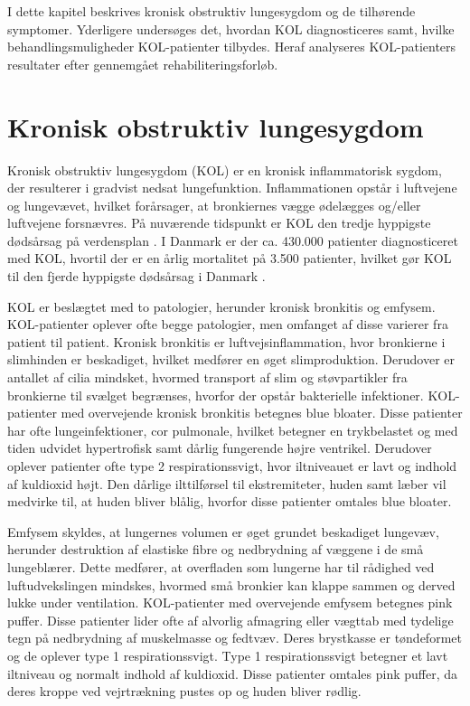 I dette kapitel beskrives kronisk obstruktiv lungesygdom og de tilhørende symptomer. Yderligere undersøges det, hvordan KOL diagnosticeres samt, hvilke behandlingsmuligheder KOL-patienter tilbydes. Heraf analyseres KOL-patienters resultater efter gennemgået rehabiliteringsforløb.

\section{Kronisk obstruktiv lungesygdom}
Kronisk obstruktiv lungesygdom (KOL) er en kronisk inflammatorisk sygdom, der resulterer i gradvist nedsat lungefunktion. Inflammationen opstår i luftvejene og lungevævet, hvilket forårsager, at bronkiernes vægge ødelægges og/eller luftvejene forsnævres. På nuværende tidspunkt er KOL den tredje hyppigste dødsårsag på verdensplan \cite{WHO2017}. I Danmark er der ca. 430.000 patienter diagnosticeret med KOL, hvortil der er en årlig mortalitet på 3.500 patienter, hvilket gør KOL til den fjerde hyppigste dødsårsag i Danmark \cite{Basisbogen2016}.


KOL er beslægtet med to patologier, herunder kronisk bronkitis og emfysem. KOL-patienter oplever ofte begge patologier, men omfanget af disse varierer fra patient til patient.\cite{Basisbogen2016}
Kronisk bronkitis er luftvejsinflammation, hvor bronkierne i slimhinden er beskadiget, hvilket medfører en øget slimproduktion. Derudover er antallet af cilia mindsket, hvormed transport af slim og støvpartikler fra bronkierne til svælget begrænses, hvorfor der opstår bakterielle infektioner.\cite{Frausing2011,Britannica2016} KOL-patienter med overvejende kronisk bronkitis betegnes blue bloater. Disse patienter har ofte lungeinfektioner, cor pulmonale, hvilket betegner en trykbelastet og med tiden udvidet hypertrofisk samt dårlig fungerende højre ventrikel. Derudover oplever patienter ofte  type 2 respirationssvigt, hvor iltniveauet er lavt og indhold af kuldioxid højt. Den dårlige ilttilførsel til ekstremiteter, huden samt læber vil medvirke til, at huden bliver blålig, hvorfor disse patienter omtales blue bloater.\cite{Healthguidances2016}

Emfysem skyldes, at lungernes volumen er øget grundet beskadiget lungevæv, herunder destruktion af elastiske fibre og nedbrydning af væggene i de små lungeblærer. Dette medfører, at overfladen som lungerne har til rådighed ved luftudvekslingen mindskes, hvormed små bronkier kan klappe sammen og derved lukke under ventilation.\cite{Frausing2011a,Flaschen-Hansen2008} KOL-patienter med overvejende emfysem betegnes pink puffer. Disse patienter lider ofte af alvorlig afmagring eller vægttab med tydelige tegn på nedbrydning af muskelmasse og fedtvæv. Deres brystkasse er tøndeformet og de oplever type 1 respirationssvigt. Type 1 respirationssvigt betegner et lavt iltniveau og normalt indhold af kuldioxid. Disse patienter omtales pink puffer, da deres kroppe ved vejrtrækning pustes op og huden bliver rødlig.\cite{Healthguidances2016}

